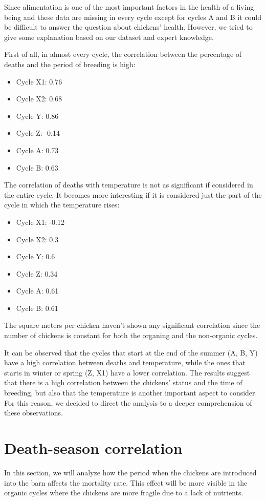 \documentclass[11pt]{article}
\begin{document}
Since alimentation is one of the most important factors in the health of a living being and these data are missing in every cycle except for cycles A and B it could be difficult to answer the question
about chickens' health.
However, we tried to give some explanation based on our dataset and expert knowledge.

First of all, in almost every cycle, the correlation between the percentage of deaths and the period of breeding is high:
\begin{itemize}
    \item Cycle X1: 0.76
    \item Cycle X2: 0.68
    \item Cycle Y: 0.86 
    \item Cycle Z: -0.14
    \item Cycle A: 0.73
    \item Cycle B: 0.63
\end{itemize}

The correlation of deaths with temperature is not as significant if considered in the entire cycle. It becomes more interesting if it is considered just the part of the cycle in which the temperature rises:
\begin{itemize}
    \item Cycle X1: -0.12
    \item Cycle X2: 0.3
    \item Cycle Y: 0.6
    \item Cycle Z: 0.34
    \item Cycle A: 0.61
    \item Cycle B: 0.61
\end{itemize}

The square meters per chicken haven't shown any significant correlation since the number of chickens is constant for both the organing and the non-organic cycles.

It can be observed that the cycles that start at the end of the summer (A, B, Y) have a high correlation between deaths and temperature, while the ones that
starts in winter or spring (Z, X1) have a lower correlation.
The results suggest that there is a high correlation between the chickens' status and the time of breeding, but also that the temperature is another important aspect
to consider. For this reason, we decided to direct the analysis to a deeper comprehension of these observations.

\section{Death-season correlation}
In this section, we will analyze how the period when the chickens are introduced into the barn affects the mortality rate. This effect will be more visible in the organic cycles where the chickens are more fragile due to a lack of nutrients.
\end{document}
